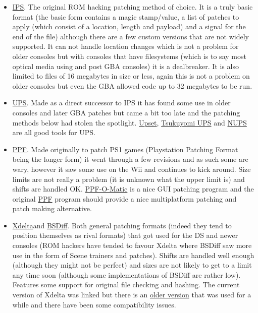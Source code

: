 \documentclass[
]{book}
\providecommand{\tightlist}{%
  \setlength{\itemsep}{0pt}\setlength{\parskip}{0pt}}
\begin{document}
\begin{itemize}
\tightlist
\item
  \href{https://www.romhacking.net/utilities/13/}{IPS}. The original ROM hacking patching method of choice. It is a truly basic format (the basic form contains a magic stamp/value, a list of patches to apply (which consist of a location, length and payload) and a signal for the end of the file) although there are a few custom versions that are not widely supported. It can not handle location changes which is not a problem for older consoles but with consoles that have filesystems (which is to say most optical media using and post GBA consoles) it is a dealbreaker. It is also limited to files of 16 megabytes in size or less, again this is not a problem on older consoles but even the GBA allowed code up to 32 megabytes to be run.
\item
  \href{http://www.romhacking.net/utilities/519/}{UPS}. Made as a direct successor to IPS it has found some use in older consoles and later GBA patches but came a bit too late and the patching methods below had stolen the spotlight. \href{http://www.romhacking.net/utilities/677/\%20}{Upset}, \href{http://www.romhacking.net/utilities/519/}{Tsukuyomi UPS} and \href{http://www.romhacking.net/utilities/606/}{NUPS} are all good tools for UPS.
\item
  \href{http://www.romhacking.net/utilities/514/}{PPF}. Made originally to patch PS1 games (Playstation Patching Format being the longer form) it went through a few revisions and as such some are wary, however it saw some use on the Wii and continues to kick around. Size limits are not really a problem (it is unknown what the upper limit is) and shifts are handled OK. \href{http://filetrip.net/pc-downloads/applications/download-ppf-o-matic-30-f29416.html}{PPF-O-Matic} is a nice GUI patching program and the original \href{http://www.romhacking.net/utilities/353/}{PPF} program should provide a nice multiplatform patching and patch making alternative.
\item
  \href{http://xdelta.org/}{Xdelta}and \href{http://www.daemonology.net/bsdiff/}{BSDiff}. Both general patching formats (indeed they tend to position themselves as rival formats) that got used for the DS and newer consoles (ROM hackers have tended to favour Xdelta where BSDiff saw more use in the form of Scene trainers and patches). Shifts are handled well enough (although they might not be perfect) and sizes are not likely to get to a limit any time soon (although some implementations of BSDiff are rather low). Features some support for original file checking and hashing. The current version of Xdelta was linked but there is an \href{http://www.evanjones.ca/software/xdelta-win32.html}{older version} that was used for a while and there have been some compatibility issues.

\end{itemize}
\end{document}
